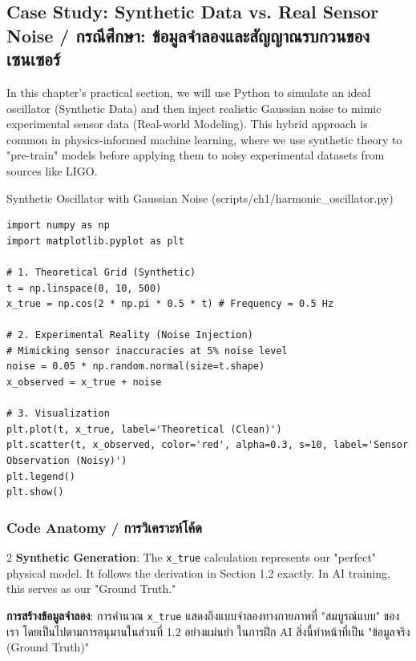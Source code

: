 \subsection{Case Study: Synthetic Data vs. Real Sensor Noise \quad / \quad \textthai{กรณีศึกษา: ข้อมูลจำลองและสัญญาณรบกวนของเซนเซอร์}}
In this chapter's practical section, we will use Python to simulate an ideal oscillator (Synthetic Data) and then inject realistic Gaussian noise to mimic experimental sensor data (Real-world Modeling). This hybrid approach is common in physics-informed machine learning, where we use synthetic theory to "pre-train" models before applying them to noisy experimental datasets from sources like LIGO.

\begin{pythonbox}{Synthetic Oscillator with Gaussian Noise (scripts/ch1/harmonic\_oscillator.py)}
\begin{lstlisting}
import numpy as np
import matplotlib.pyplot as plt

# 1. Theoretical Grid (Synthetic)
t = np.linspace(0, 10, 500)
x_true = np.cos(2 * np.pi * 0.5 * t) # Frequency = 0.5 Hz

# 2. Experimental Reality (Noise Injection)
# Mimicking sensor inaccuracies at 5% noise level
noise = 0.05 * np.random.normal(size=t.shape)
x_observed = x_true + noise

# 3. Visualization
plt.plot(t, x_true, label='Theoretical (Clean)')
plt.scatter(t, x_observed, color='red', alpha=0.3, s=10, label='Sensor Observation (Noisy)')
plt.legend()
plt.show()
\end{lstlisting}
\end{pythonbox}

\subsubsection*{Code Anatomy \quad / \quad \textthai{การวิเคราะห์โค้ด}}
\begin{paracol}{2}
\textbf{Synthetic Generation}: The \texttt{x\_true} calculation represents our "perfect" physical model. It follows the derivation in Section 1.2 exactly. In AI training, this serves as our "Ground Truth."

\switchcolumn

\begin{thai}
\textbf{การสร้างข้อมูลจำลอง}: การคำนวณ \texttt{x\_true} แสดงถึงแบบจำลองทางกายภาพที่ "สมบูรณ์แบบ" ของเรา โดยเป็นไปตามการอนุมานในส่วนที่ 1.2 อย่างแม่นยำ ในการฝึก AI สิ่งนี้ทำหน้าที่เป็น "ข้อมูลจริง (Ground Truth)"
\end{thai}
\end{paracol}

